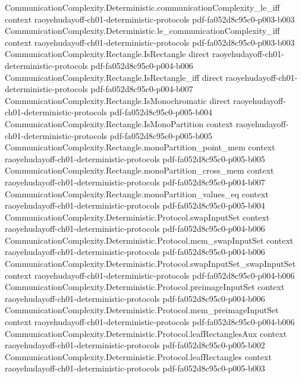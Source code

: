 \begin{theorem}
  {CommunicationComplexity.Deterministic.communicationComplexity_le_iff}
  {context}
  {raoyehudayoff-ch01-deterministic-protocols}
  {pdf-fa052d8c95c0-p003-b003}
\proofstep
  {CommunicationComplexity.Deterministic.le_communicationComplexity_iff}
  {context}
  {raoyehudayoff-ch01-deterministic-protocols}
  {pdf-fa052d8c95c0-p003-b003}
\proofstep
  {CommunicationComplexity.Rectangle.IsRectangle}
  {direct}
  {raoyehudayoff-ch01-deterministic-protocols}
  {pdf-fa052d8c95c0-p004-b006}
\proofstep
  {CommunicationComplexity.Rectangle.IsRectangle_iff}
  {direct}
  {raoyehudayoff-ch01-deterministic-protocols}
  {pdf-fa052d8c95c0-p004-b007}
\proofstep
  {CommunicationComplexity.Rectangle.IsMonochromatic}
  {direct}
  {raoyehudayoff-ch01-deterministic-protocols}
  {pdf-fa052d8c95c0-p005-b004}
\proofstep
  {CommunicationComplexity.Rectangle.IsMonoPartition}
  {context}
  {raoyehudayoff-ch01-deterministic-protocols}
  {pdf-fa052d8c95c0-p005-b005}
\proofstep
  {CommunicationComplexity.Rectangle.monoPartition_point_mem}
  {context}
  {raoyehudayoff-ch01-deterministic-protocols}
  {pdf-fa052d8c95c0-p005-b005}
\proofstep
  {CommunicationComplexity.Rectangle.monoPartition_cross_mem}
  {context}
  {raoyehudayoff-ch01-deterministic-protocols}
  {pdf-fa052d8c95c0-p004-b007}
\proofstep
  {CommunicationComplexity.Rectangle.monoPartition_values_eq}
  {context}
  {raoyehudayoff-ch01-deterministic-protocols}
  {pdf-fa052d8c95c0-p005-b004}
\proofstep
  {CommunicationComplexity.Deterministic.Protocol.swapInputSet}
  {context}
  {raoyehudayoff-ch01-deterministic-protocols}
  {pdf-fa052d8c95c0-p004-b006}
\proofstep
  {CommunicationComplexity.Deterministic.Protocol.mem_swapInputSet}
  {context}
  {raoyehudayoff-ch01-deterministic-protocols}
  {pdf-fa052d8c95c0-p004-b006}
\proofstep
  {CommunicationComplexity.Deterministic.Protocol.swapInputSet_swapInputSet}
  {context}
  {raoyehudayoff-ch01-deterministic-protocols}
  {pdf-fa052d8c95c0-p004-b006}
\proofstep
  {CommunicationComplexity.Deterministic.Protocol.preimageInputSet}
  {context}
  {raoyehudayoff-ch01-deterministic-protocols}
  {pdf-fa052d8c95c0-p004-b006}
\proofstep
  {CommunicationComplexity.Deterministic.Protocol.mem_preimageInputSet}
  {context}
  {raoyehudayoff-ch01-deterministic-protocols}
  {pdf-fa052d8c95c0-p004-b006}
\proofstep
  {CommunicationComplexity.Deterministic.Protocol.leafRectanglesAux}
  {context}
  {raoyehudayoff-ch01-deterministic-protocols}
  {pdf-fa052d8c95c0-p005-b002}
\proofstep
  {CommunicationComplexity.Deterministic.Protocol.leafRectangles}
  {context}
  {raoyehudayoff-ch01-deterministic-protocols}
  {pdf-fa052d8c95c0-p005-b003}

\end{theorem}
